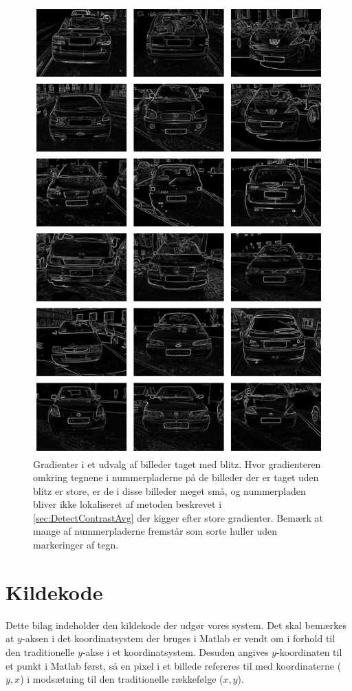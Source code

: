 \documentclass[11pt,a4paper,final]{article}
\begin{document}
\begin{figure}[htp]
\centering
\includegraphics[width=12cm]{appendix/illu/badgrads.png} 
\caption{Gradienter i et udvalg af billeder taget med blitz. Hvor gradienteren omkring tegnene i nummerpladerne på de billeder der er taget uden blitz er store, er de i disse billeder meget små, og nummerpladen bliver ikke lokaliseret af metoden beskrevet i \vref{sec:DetectContrastAvg} der kigger efter store gradienter. Bemærk at mange af nummerpladerne fremstår som sorte huller uden markeringer af tegn.}
\label{fig:illu:badgrads}
\end{figure}




\newpage
\section{Kildekode}
Dette bilag indeholder den kildekode der udgør vores system. Det skal bemærkes at $y$-aksen i det koordinatsystem der bruges i Matlab er vendt om i forhold til den traditionelle $y$-akse i et koordinatsystem. Desuden angives $y$-koordinaten til et punkt i Matlab først, så en pixel i et billede refereres til med koordinaterne ($y,x$) i modsætning til den traditionelle rækkefølge ($x,y$).
\end{document}

